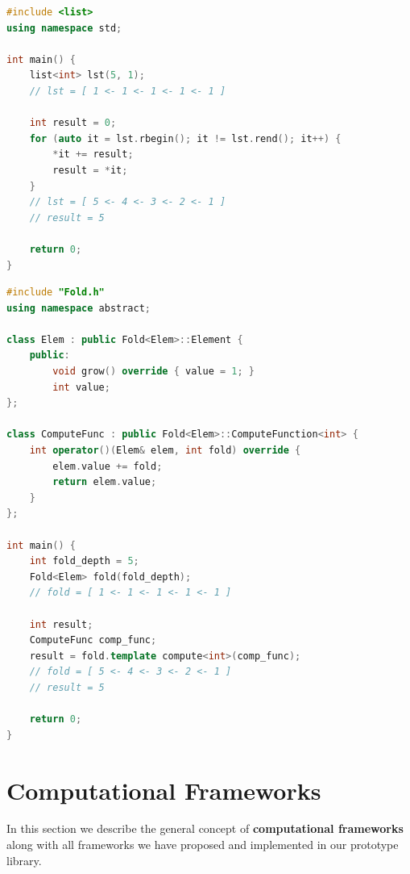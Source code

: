 \begin{lstlisting}[caption={Left fold computation using standard STL list class template},label={lst:left_fold_list},language=C++]
#include <list>
using namespace std;

int main() {
    list<int> lst(5, 1);
    // lst = [ 1 <- 1 <- 1 <- 1 <- 1 ]
    
    int result = 0;
    for (auto it = lst.rbegin(); it != lst.rend(); it++) {
        *it += result;
        result = *it;
    }
    // lst = [ 5 <- 4 <- 3 <- 2 <- 1 ]
    // result = 5
    
    return 0;
}
\end{lstlisting}

\begin{lstlisting}[caption={Left fold computation using our Fold computational framework},label={lst:left_fold_framework},language=C++]
#include "Fold.h"
using namespace abstract;

class Elem : public Fold<Elem>::Element {
    public:
        void grow() override { value = 1; }
        int value;
};

class ComputeFunc : public Fold<Elem>::ComputeFunction<int> {
    int operator()(Elem& elem, int fold) override {
        elem.value += fold;
        return elem.value;
    }
};

int main() {
    int fold_depth = 5;
    Fold<Elem> fold(fold_depth);
    // fold = [ 1 <- 1 <- 1 <- 1 <- 1 ]
    
    int result;
    ComputeFunc comp_func;
    result = fold.template compute<int>(comp_func);
    // fold = [ 5 <- 4 <- 3 <- 2 <- 1 ]
    // result = 5
    
    return 0;
}
\end{lstlisting}

\section{Computational Frameworks}
\label{computational_frameworks_main}
\quad In this section we describe the general concept of \textbf{computational frameworks} along with all frameworks we have proposed and implemented in our prototype library.
